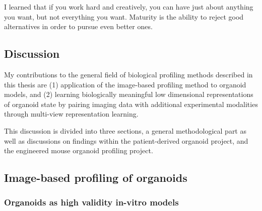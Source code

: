 \begin{savequote}[75mm]
I learned that if you work hard and creatively, you can have just about anything you want, but not everything you want. Maturity is the ability to reject good alternatives in order to pursue even better ones.

\end{savequote}

\begin{flushleft}

\chapter{Discussion}

My contributions to the general field of biological profiling methods described in this thesis are (1) application of the image-based profiling method to organoid models, and (2) learning biologically meaningful low dimensional representations of organoid state by pairing imaging data with additional experimental modalities through multi-view representation learning. 
\bigbreak

This discussion is divided into three sections, a general methodological part as well as discussions on findings within the patient-derived organoid project, and the engineered mouse organoid profiling project.


\section{Image-based profiling of organoids}

\subsection{Organoids as high validity in-vitro models}


\end{flushleft}
